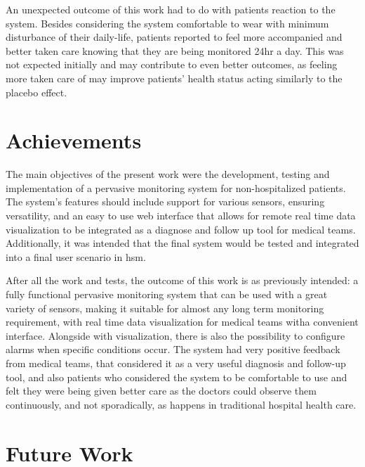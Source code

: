 An unexpected outcome of this work had to do with patients reaction to the system. Besides considering the system comfortable to wear with minimum disturbance of their daily-life, patients reported to feel more accompanied and better taken care knowing that they are being monitored 24hr a day. This was not expected initially and may contribute to even better outcomes, as feeling more taken care of may improve patients' health status acting similarly to the placebo effect.



\section{Achievements}
\label{section:achievements}

The main objectives of the present work were the development, testing and implementation of a pervasive monitoring system for non-hospitalized patients. The system's features should include support for various sensors, ensuring versatility, and an  easy to use web interface that allows for remote real time data visualization to be integrated as a diagnose and follow up tool for medical teams. Additionally, it was intended that the final system would be tested and integrated into a final user scenario in \ac{hsm}.

After all the work and tests, the outcome of this work is as previously intended: a fully functional pervasive monitoring system that can be used with a great variety of sensors, making it suitable for almost any long term monitoring requirement, with real time data visualization for medical teams witha convenient interface. Alongside with visualization, there is also the possibility to configure alarms when specific conditions occur. The system had very positive feedback from medical teams, that considered it as a very useful diagnosis and follow-up tool, and also patients who considered the system to be comfortable to use and felt they were being given better care as the doctors could observe them continuously, and not sporadically, as happens in traditional hospital health care.


\section{Future Work}
\label{section:future}

